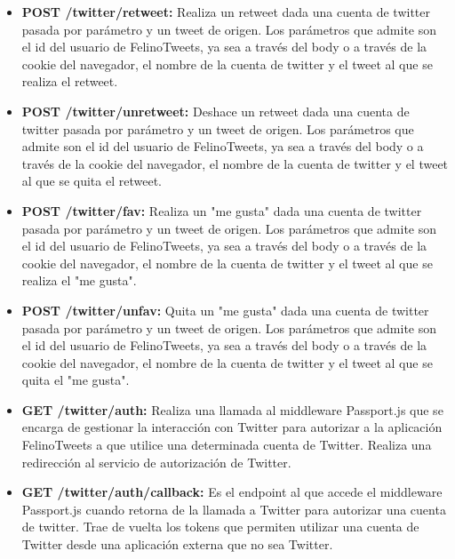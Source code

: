 \documentclass[a4paper]{article}
\begin{document}
\begin{itemize}
		\item \textbf{POST /twitter/retweet:} Realiza un retweet dada una cuenta de twitter pasada por parámetro y un tweet de origen. Los parámetros que admite son el id del usuario de FelinoTweets, ya sea a través del body o a través de la cookie del navegador, el nombre de la cuenta de twitter y el tweet al que se realiza el retweet.
		\newpage
		\item \textbf{POST /twitter/unretweet:} Deshace un retweet dada una cuenta de twitter pasada por parámetro y un tweet de origen. Los parámetros que admite son el id del usuario de FelinoTweets, ya sea a través del body o a través de la cookie del navegador, el nombre de la cuenta de twitter y el tweet al que se quita el retweet.
		
		\item \textbf{POST /twitter/fav:} Realiza un "me gusta" dada una cuenta de twitter pasada por parámetro y un tweet de origen. Los parámetros que admite son el id del usuario de FelinoTweets, ya sea a través del body o a través de la cookie del navegador, el nombre de la cuenta de twitter y el tweet al que se realiza el "me gusta".
		
		\item \textbf{POST /twitter/unfav:} Quita un "me gusta" dada una cuenta de twitter pasada por parámetro y un tweet de origen. Los parámetros que admite son el id del usuario de FelinoTweets, ya sea a través del body o a través de la cookie del navegador, el nombre de la cuenta de twitter y el tweet al que se quita el "me gusta".
		
		\item \textbf{GET /twitter/auth:} Realiza una llamada al middleware Passport.js que se encarga de gestionar la interacción con Twitter para autorizar a la aplicación FelinoTweets a que utilice una determinada cuenta de Twitter. Realiza una redirección al servicio de autorización de Twitter.
		
		\item \textbf{GET /twitter/auth/callback:} Es el endpoint al que accede el middleware Passport.js cuando retorna de la llamada a Twitter para autorizar una cuenta de twitter. Trae de vuelta los tokens que permiten utilizar una cuenta de Twitter desde una aplicación externa que no sea Twitter.
	\end{itemize}
	
\end{document}
